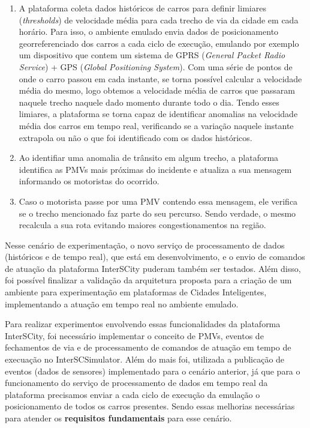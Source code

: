 \begin{enumerate}
    \item A plataforma coleta dados históricos de carros para definir limiares (\textit{thresholds}) de velocidade média para cada trecho de via da cidade em cada horário.
        Para isso, o ambiente emulado envia dados de posicionamento georreferenciado dos carros a cada ciclo de execução, emulando por exemplo um dispositivo que contem um
        sistema de GPRS (\textit{General Packet Radio Service}) + GPS (\textit{Global Positioning System}).
        Com uma série de pontos de onde o carro passou em cada instante, se torna possível calcular a velocidade média do mesmo, logo obtemos a velocidade média de carros
        que passaram naquele trecho naquele dado momento durante todo o dia.
        Tendo esses limiares, a plataforma se torna capaz de identificar anomalias na velocidade média dos carros em tempo real, verificando se a variação naquele instante
        extrapola ou não o que foi identificado com os dados históricos.

    \item Ao identifiar uma anomalia de trânsito em algum trecho, a plataforma identifica as PMVs mais próximas do incidente e atualiza a sua mensagem informando os motoristas
        do ocorrido.

    \item Caso o motorista passe por uma PMV contendo essa mensagem, ele verifica se o trecho mencionado faz parte do seu percurso. Sendo verdade, o mesmo recalcula a sua
        rota evitando maiores congestionamentos na região.
\end{enumerate}

Nesse cenário de experimentação, o novo serviço de processamento de dados (históricos e de tempo real), que está em desenvolvimento, e o envio de comandos de atuação da plataforma
InterSCity puderam também ser testados.
Além disso, foi possível finalizar a validação da arquitetura proposta para a criação de um ambiente para experimentação em plataformas de Cidades Inteligentes,
implementando a atuação em tempo real no ambiente emulado.

Para realizar experimentos envolvendo essas funcionalidades da plataforma InterSCity, foi necessário implementar o conceito de PMVs, eventos de fechamentos de via e de
processamento de comandos de atuação em tempo de execuação no InterSCSimulator.
Além do mais foi, utilizada a publicação de eventos (dados de sensores) implementado para o cenário anterior, já que para o funcionamento do serviço de processamento de dados
em tempo real da plataforma precisamos enviar a cada ciclo de execução da emulação o posicionamento de todos os carros presentes.
Sendo essas melhorias necessárias para atender os \textbf{requisitos fundamentais} para esse cenário.

